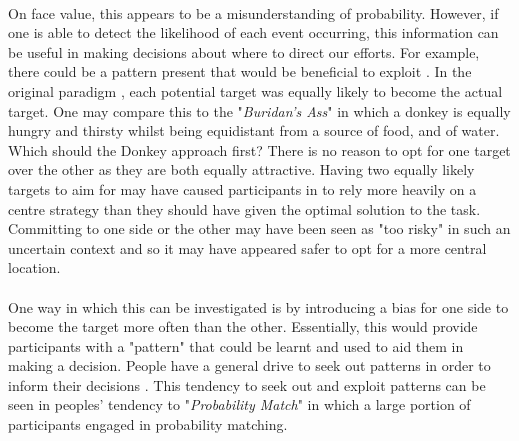 \documentclass[12pt]{article}
\begin{document}
\paragraph{} On face value, this appears to be a misunderstanding of probability. However, if one is able to detect the likelihood of each event occurring, this information can be useful in making decisions about where to direct our efforts. For example, there could be a pattern present that would be beneficial to exploit \citep{wolford2004searching}. In the original paradigm \citep{clarke2015failure}, each potential target was equally likely to become the actual target. One may compare this to the "\textit{Buridan's Ass}" in which a donkey is equally hungry and thirsty whilst being equidistant from a source of food, and of water. Which should the Donkey approach first? There is no reason to opt for one target over the other as they are both equally attractive. Having two equally likely targets to aim for may have caused participants in \cite{clarke2015failure} to rely more heavily on a centre strategy than they should have given the optimal solution to the task. Committing to one side or the other may have been seen as "too risky" in such an uncertain context and so it may have appeared safer to opt for a more central location. %

\paragraph{} One way in which this can be investigated is by introducing a bias for one side to become the target more often than the other. Essentially, this would provide participants with a "pattern" that could be learnt and used to aid them in making a decision. People have a general drive to seek out patterns in order to inform their decisions \citep{yellott1969probability}. This tendency to seek out and exploit patterns can be seen in peoples' tendency to "\textit{Probability Match}" \citep{Koehler2010} in which a large portion of participants engaged in probability matching. %

\end{document}
